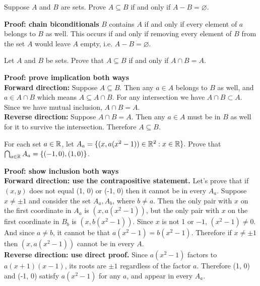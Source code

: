 \documentclass{article}
\begin{document}
\begin{problem}
Suppose $A$ and $B$ are sets. Prove $A \subseteq B$ if and only if $A - B = \varnothing$.
\end{problem}
\textbf{Proof: chain biconditionals}
$B$ contains $A$ if and only if every element of $a$ belongs to $B$ as well. This occurs if and only if removing every element of $B$ from the set $A$ would leave $A$ empty, i.e. $A - B = \varnothing$.

\begin{problem}
Let $A$ and $B$ be sets. Prove that $A \subseteq B$ if and only if $A \cap B = A$.
\end{problem}
\textbf{Proof: prove implication both ways}
\\

\textbf{Forward direction:} Suppose $A \subseteq B$. Then any $a \in A$ belongs to $B$ as well, and $a \in A \cap B$ which means $A \subseteq A \cap B$. For any intersection we have $A \cap B \subset A$. Since we have mutual inclusion, $A \cap B = A$.
\\

\textbf{Reverse direction:} Suppose $A \cap B = A$. Then any $a \in A$ must be in $B$ as well for it to survive the intersection. Therefore $A \subseteq B$.

\begin{problem}
For each set $a \in \mathbb{R}$, let $A_a = \{(x, a(x^2 -1)) \in \mathbb{R}^2 : x \in \mathbb{R}\}.$ Prove that $\bigcap_{a \in \mathbb{R}} A_a = \{(-1, 0), (1, 0)\}$.
\end{problem}

\textbf{Proof: show inclusion both ways}
\\

\textbf{Forward direction: use the contrapositive statement.} Let's prove that if $(x, y)$ does not equal (1, 0) or (-1, 0) then it cannot be in every $A_a$. Suppose $x \neq \pm 1$ and consider the set $A_a, A_b$, where $b \neq a$. Then the only pair with $x$ on the first coordinate in $A_a$ is $(x, a(x^2 - 1))$, but the only pair with $x$ on the first coordinate in $B_b$ is $(x, b(x^2 - 1))$. Since $x$ is not 1 or $-1$, $(x^2 - 1) \neq 0$. And since $a \neq b$, it cannot be that $a(x^2 - 1) = b(x^2 - 1)$. Therefore if $x \neq \pm 1$ then $(x, a(x^2 - 1))$ cannot be in every $A$.
\\

\textbf{Reverse direction: use direct proof.} Since $a(x^2 - 1)$ factors to $a(x + 1)(x - 1)$, its roots are $\pm 1$ regardless of the factor $a$. Therefore (1, 0) and (-1, 0) satisfy $a(x^2 - 1)$ for any $a$, and appear in every $A_a$.
\end{document}
